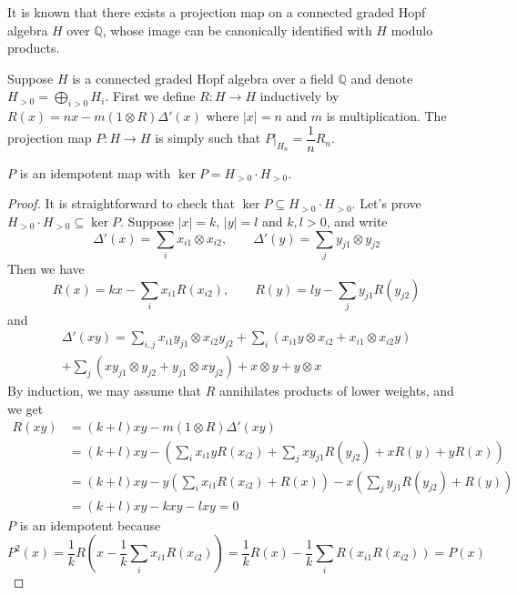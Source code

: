 It is known that there exists a projection map on a connected graded Hopf algebra $H$ over $\mathbb Q$, whose image can be canonically identified with $H$ modulo products.

\begin{definition}\label{def: projection map P}\cite{CharltonDuhrGangl_SingleValuedPolylogs}
Suppose $H$ is a connected graded Hopf algebra over a field $\mathbb Q$ and denote $H_{>0}=\bigoplus_{i>0}H_i$. First we define $R:H\to H$ inductively by $R(x)=nx-m(1\otimes R)\Delta'(x)$ where $|x|=n$ and $m$ is multiplication. The projection map $P:H\to H$ is simply such that $P|_{H_n}=\dfrac{1}{n}R_n$.
\end{definition}

\begin{proposition}
$P$ is an idempotent map with $\ker P=H_{>0}\cdot H_{>0}$.
\end{proposition}

\begin{proof}
It is straightforward to check that $\ker P\subseteq H_{>0}\cdot H_{>0}$. Let's prove $H_{>0}\cdot H_{>0}\subseteq\ker P$. Suppose $|x|=k$, $|y|=l$ and $k,l>0$, and write
\[
\Delta'(x)=\sum_{i}x_{i1}\otimes x_{i2},\qquad \Delta'(y)=\sum_{j}y_{j1}\otimes y_{j2}
\]
Then we have
\[
R(x)=kx-\sum_i x_{i1}R(x_{i2}),\qquad R(y)=ly-\sum_j y_{j1}R(y_{j2})
\]
and
\begin{multline*}
\Delta'(xy)=\sum_{i,j}x_{i1}y_{j1}\otimes x_{i2}y_{j2}+\sum_{i}\left(x_{i1}y\otimes x_{i2}+x_{i1}\otimes x_{i2}y\right)\\
+\sum_j\left(xy_{j1}\otimes y_{j2}+y_{j1}\otimes xy_{j2}\right)+x\otimes y+y\otimes x
\end{multline*}
By induction, we may assume that $R$ annihilates products of lower weights, and we get
\begin{align*}
R(xy)&=(k+l)xy-m(1\otimes R)\Delta'(xy)\\
&=(k+l)xy-\left(\sum_{i}x_{i1}yR(x_{i2})+\sum_jxy_{j1}R(y_{j2})+xR(y)+yR(x)\right)\\
&=(k+l)xy-y\left(\sum_ix_{i1}R(x_{i2})+R(x)\right)-x\left(\sum_jy_{j1}R(y_{j2})+R(y)\right)\\
&=(k+l)xy-kxy-lxy=0
\end{align*}
$P$ is an idempotent because
\[
P^2(x)=\frac{1}{k}R\left(x-\frac{1}{k}\sum_ix_{i1}R(x_{i2})\right)=\frac{1}{k}R(x)-\frac{1}{k}\sum_iR\left(x_{i1}R(x_{i2})\right)=P(x)
\]
\end{proof}

